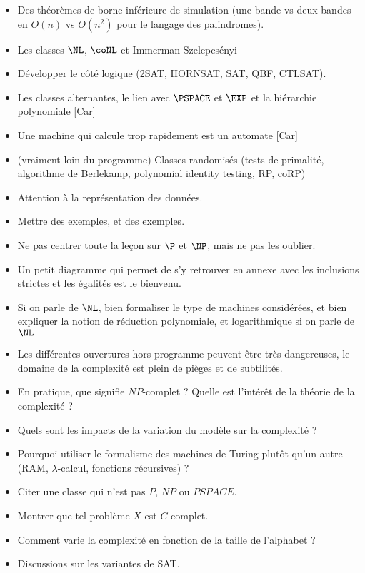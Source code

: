 \documentclass{agregfiche}
\begin{document}
\secidees

\begin{itemize}
    \item Des théorèmes de borne inférieure de simulation
(une bande vs deux bandes en $O(n)$ vs $O(n^2)$ 
pour le langage des palindromes).
    \item Les classes $\NL$, $\coNL$ et Immerman-Szelepcsényi
    \item Développer le côté logique (2SAT, HORNSAT, SAT, QBF, CTLSAT).
    \item Les classes alternantes, le lien avec 
        $\PSPACE$ et $\EXP$ et la hiérarchie polynomiale [Car]
    \item Une machine qui calcule trop rapidement est un automate 
        [Car]
    \item (vraiment loin du programme) Classes randomisés (tests de primalité, algorithme de Berlekamp,
        polynomial identity testing, RP, coRP)
     
\end{itemize}

\secpieges

\begin{itemize}
    \item Attention à la représentation des données.
    \item Mettre des exemples, et des exemples.
    \item Ne pas centrer toute la leçon sur $\P$ et $\NP$, mais ne pas les oublier.
  	\item Un petit diagramme qui permet de s'y retrouver 
    en annexe avec les inclusions strictes et les égalités est le bienvenu.
    \item Si on parle de $\NL$, bien formaliser le type de machines 
        considérées,  et bien expliquer la notion de réduction polynomiale,
        et logarithmique si on parle de $\NL$
    \item Les différentes ouvertures hors programme peuvent être très dangereuses, le domaine de la complexité est plein de pièges et de subtilités.
    

\end{itemize}


\secquestionsclassiques

\begin{itemize}
    \item En pratique, que signifie $NP$-complet ? Quelle est l'intérêt de la théorie de la complexité ?
    \item Quels sont les impacts de la variation du modèle sur la complexité ?
    \item Pourquoi utiliser le formalisme des machines de Turing 
        plutôt qu'un autre (RAM, $\lambda$-calcul, fonctions récursives) ?
    \item Citer une classe qui n'est pas $P$, $NP$ ou $PSPACE$.
    \item Montrer que tel problème $X$ est $C$-complet.
    \item Comment varie la complexité en fonction de la taille de l'alphabet ?
    \item Discussions sur les variantes de SAT.
\end{itemize}
\end{document}
